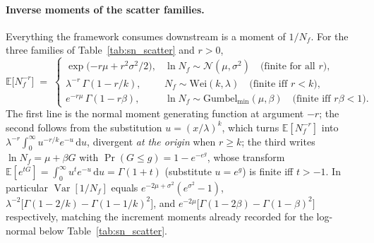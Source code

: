 \documentclass[11pt,a4paper]{article}
\theoremstyle{plain}
\theoremstyle{definition}
\theoremstyle{remark}
\begin{document}
\paragraph{Inverse moments of the scatter families.}
Everything the framework consumes downstream is a moment of $1/N_f$.
For the three families of Table~\ref{tab:sn_scatter} and $r > 0$,
\begin{equation}\label{eq:miner_invmom}
  \mathbb{E}\big[N_f^{-r}\big] \;=\;
  \begin{cases}
    \exp\big({-r\mu + r^2\sigma^2/2}\big), & \ln N_f \sim \mathcal{N}(\mu,\sigma^2) \quad \text{(finite for all $r$)},\\[3pt]
    \lambda^{-r}\,\Gamma(1 - r/k), & N_f \sim \mathrm{Wei}(k,\lambda) \quad \text{(finite iff $r < k$)},\\[3pt]
    e^{-r\mu}\,\Gamma(1 - r\beta), & \ln N_f \sim \mathrm{Gumbel}_{\min}(\mu,\beta) \quad \text{(finite iff $r\beta < 1$)}.
  \end{cases}
\end{equation}
The first line is the normal moment generating function at argument $-r$; the second follows from the substitution $u = (x/\lambda)^k$, which turns $\mathbb{E}[N_f^{-r}]$ into $\lambda^{-r}\int_0^\infty u^{-r/k}e^{-u}\,\mathrm{d}u$, divergent \emph{at the origin} when $r \ge k$; the third writes $\ln N_f = \mu + \beta G$ with $\Pr(G \le g) = 1 - e^{-e^{g}}$, whose transform $\mathbb{E}[e^{tG}] = \int_0^\infty u^{t}e^{-u}\,\mathrm{d}u = \Gamma(1+t)$ (substitute $u = e^g$) is finite iff $t > -1$.
In particular $\operatorname{Var}[1/N_f]$ equals $e^{-2\mu+\sigma^2}(e^{\sigma^2}-1)$, $\lambda^{-2}\big[\Gamma(1-2/k)-\Gamma(1-1/k)^2\big]$, and $e^{-2\mu}\big[\Gamma(1-2\beta)-\Gamma(1-\beta)^2\big]$ respectively, matching the increment moments already recorded for the log-normal below Table~\ref{tab:sn_scatter}.
\end{document}
